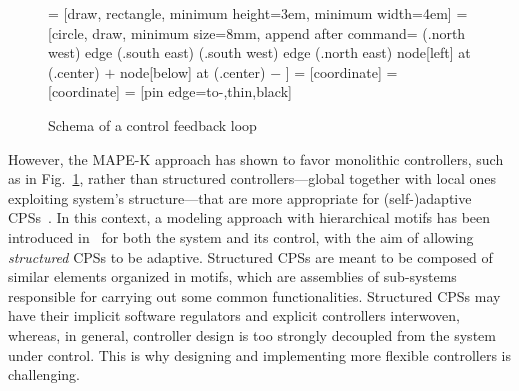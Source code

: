 \documentclass[runningheads]{llncs}
\newcommand{\mdash}[1][]{{#1}---{#1}}
\newcommand{\measure}[1][]{y\ifx#1\relax\else^{#1}\fi}
\newcommand{\knob}[1][]{u\ifx#1\relax\else^{#1}\fi}
\newcommand{\disturbance}[1][]{d\ifx#1\relax\else^{#1}\fi}
\newcommand{\plant}[1][]{\Psi\ifx#1\relax\else^{#1}\fi}
\newcommand{\controller}[1][]{\mathcal{C}\ifx#1\relax\else^{#1}\fi}
\newcommand{\setpoint}[2][]{#2[{%
      \ifthenelse{\equal{#1}{}}{}{#1,}%
      \mathit{ref}%
  }]%
}
\begin{document}
\begin{figure}[t!]
       \centering
        = [draw, rectangle, 
    minimum height=3em, minimum width=4em]
 = [circle, draw, minimum size=8mm,
                append after command={\pgfextra{\let\LN\tikzlastnode}
                       (\LN.north west) edge (\LN.south east)
                            (\LN.south west) edge (\LN.north east)
                    node[left]     at (\LN.center) {$+$}
                    node[below]    at (\LN.center) {$-$}
                                    }]
 = [coordinate]
 = [coordinate]
 = [pin edge={to-,thin,black}]

\caption{Schema of a control feedback loop %
}
\label{fig:CL}
\end{figure}


However, the MAPE-K approach has shown to favor monolithic controllers, such as in Fig.~\ref{fig:CL}, rather than structured controllers\mdash global together with local ones exploiting system's structure\mdash that are more appropriate for (self-)adaptive CPSs~\cite{Lemos23}.
In this context, a modeling approach with 
hierarchical motifs has been introduced in~\cite{BCK26-Motifs}  
for both the system and its control, 
with the aim of allowing {\em structured} CPSs to be adaptive. 
Structured CPSs are meant to be composed of similar elements organized in motifs, which are assemblies of sub-systems responsible for carrying out some common functionalities. 
Structured CPSs may have their implicit software regulators and explicit controllers interwoven, whereas, in general, controller design is too strongly decoupled from the system under control. This is why designing and implementing more flexible controllers is challenging. 
\end{document}
